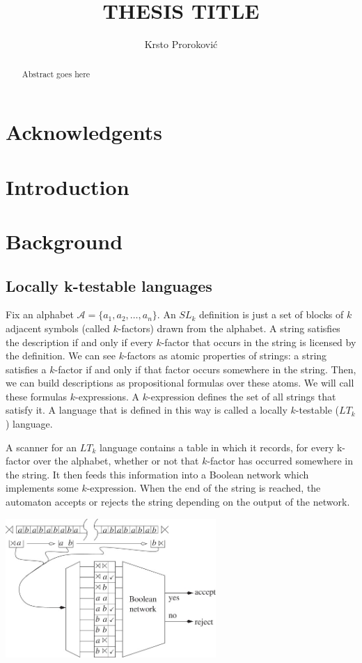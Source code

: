 \documentclass[titlepage]{report}
\title{THESIS TITLE}
\author{Krsto Proroković}
\makeatletter
\newcommand{\RemoveAlgoNumber}{\renewcommand{\fnum@algocf}{\AlCapSty{\AlCapFnt\algorithmcfname}}}
\makeatother
\begin{document}
\maketitle
\RemoveAlgoNumber

\begin{abstract}
Abstract goes here
\end{abstract}

\chapter*{Acknowledgents}

\tableofcontents

\chapter{Introduction}

\chapter{Background}

\section{Locally k-testable languages}

Fix an alphabet $\mathcal{A} = \{ a_1, a_2, \ldots, a_n \}$. An $SL_k$ definition is just a set of blocks of $k$ adjacent symbols (called $k$-factors) drawn from the alphabet. A string satisfies the description if and only if every $k$-factor that occurs in the string is licensed by the definition. We can see $k$-factors as atomic properties of strings: a string satisfies a $k$-factor if and only if that factor occurs somewhere in the string. Then, we can build descriptions as propositional formulas over these atoms. We will call these formulas $k$-expressions. A $k$-expression defines the set of all strings that satisfy it. A language that is defined in this way is called a locally $k$-testable ($LT_k$) language.
\par
A scanner for an $LT_k$ language contains a table in which it records, for every k-factor over the alphabet, whether or not that $k$-factor has occurred somewhere in the string. It then feeds this information into a Boolean network which implements some $k$-expression. When the end of the string is reached, the automaton accepts or rejects the string depending on the output of the network.

\begin{center}
\includegraphics[width=80mm]{locally_k-testable.jpg}
\end{center}
\end{document}
